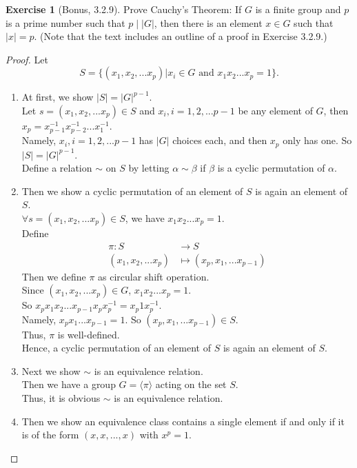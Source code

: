 \documentclass[14pt]{amsart}
\theoremstyle{plain}
\theoremstyle{definition}
\newtheorem{exer}[lem]{Exercise}
\begin{document}
\begin{exer}[Bonus, 3.2.9]
Prove Cauchy's Theorem: If $G$ is a finite group and $p$ is a prime number such that $p\mid |G|$, then there is an element $x\in G$ such that $|x|=p$.
(Note that the text includes an outline of a proof in Exercise 3.2.9.)
\end{exer}
\begin{proof}
	Let
	\[S=\{ (x_1,x_2,...x_p)| x_i \in G \text{ and } x_1x_2...x_p =1\}.\]
	\begin{enumerate}
	  \item
		At first, we show $|S|= |G|^{p-1}$.\\
 	    Let $s =(x_1,x_2,...x_p) \in S$ and $x_i, i = 1,2,...p-1$ be any element of $G$, then $x_p = x_{p-1}^{-1}x_{p-2}^{-1}...x_1^{-1}$. \\
		Namely, $x_i,i = 1,2,...p-1$ has $|G|$ choices each, and then $x_p$ only has one. So $|S| = |G|^{p-1}$.	\\
		Define a relation $\sim $ on $S$ by letting $\alpha \sim \beta$ if $\beta$ is a cyclic permutation of $\alpha$.
	  \item
	  Then we show a cyclic permutation of an element of $S$ is again an element of $S$.\\
  	$\forall s = (x_1,x_2,...x_p) \in S$, we have $x_1x_2...x_p = 1$.\\
	Define 
	\begin{align*}
		\pi: S &\to S	\\
		(x_1,x_2,...x_p) &\mapsto (x_p,x_1,...x_{p-1})	
	\end{align*}
	Then we define $\pi$ as circular shift operation.\\
	Since $(x_1,x_2,...x_p) \in G$, $x_1x_2...x_p =1$.\\
	So $x_px_1x_2...x_{p-1}x_px_p^{-1} = x_p1 x_p^{-1}$.\\
	Namely, $x_px_1...x_{p-1} =1$. So $(x_p,x_1,...x_{p-1}) \in S$.\\
	Thus, $\pi$ is well-defined.\\
	Hence, a cyclic permutation of an element of $S$ is again an element of $S$.
	  \item
		Next we show $\sim $ is an equivalence relation.\\
 	   	Then we have a group $G = \langle \pi \rangle$ acting on the set $S$.\\
		Thus, it is obvious $\sim $ is an equivalence relation.
	\item	
	  Then we show an equivalence class contains a single element if and only if it is of the form $(x,x,...,x)$ with $x^p = 1$.\\

\end{enumerate}
\end{proof}
\end{document}
